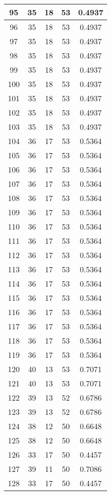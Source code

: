 \documentclass[letterpaper, 12pt]{article}
\begin{document}
\begin{longtable}{|c|c|c|c|c|}
\hline
95 & 35 & 18 & 53 & 0.4937 \\
\hline
96 & 35 & 18 & 53 & 0.4937 \\
\hline
97 & 35 & 18 & 53 & 0.4937 \\
\hline
98 & 35 & 18 & 53 & 0.4937 \\
\hline
99 & 35 & 18 & 53 & 0.4937 \\
\hline
100 & 35 & 18 & 53 & 0.4937 \\
\hline
101 & 35 & 18 & 53 & 0.4937 \\
\hline
102 & 35 & 18 & 53 & 0.4937 \\
\hline
103 & 35 & 18 & 53 & 0.4937 \\
\hline
104 & 36 & 17 & 53 & 0.5364 \\
\hline
105 & 36 & 17 & 53 & 0.5364 \\
\hline
106 & 36 & 17 & 53 & 0.5364 \\
\hline
107 & 36 & 17 & 53 & 0.5364 \\
\hline
108 & 36 & 17 & 53 & 0.5364 \\
\hline
109 & 36 & 17 & 53 & 0.5364 \\
\hline
110 & 36 & 17 & 53 & 0.5364 \\
\hline
111 & 36 & 17 & 53 & 0.5364 \\
\hline
112 & 36 & 17 & 53 & 0.5364 \\
\hline
113 & 36 & 17 & 53 & 0.5364 \\
\hline
114 & 36 & 17 & 53 & 0.5364 \\
\hline
115 & 36 & 17 & 53 & 0.5364 \\
\hline
116 & 36 & 17 & 53 & 0.5364 \\
\hline
117 & 36 & 17 & 53 & 0.5364 \\
\hline
118 & 36 & 17 & 53 & 0.5364 \\
\hline
119 & 36 & 17 & 53 & 0.5364 \\
\hline
120 & 40 & 13 & 53 & 0.7071 \\
\hline
121 & 40 & 13 & 53 & 0.7071 \\
\hline
122 & 39 & 13 & 52 & 0.6786 \\
\hline
123 & 39 & 13 & 52 & 0.6786 \\
\hline
124 & 38 & 12 & 50 & 0.6648 \\
\hline
125 & 38 & 12 & 50 & 0.6648 \\
\hline
126 & 33 & 17 & 50 & 0.4457 \\
\hline
127 & 39 & 11 & 50 & 0.7086 \\
\hline
128 & 33 & 17 & 50 & 0.4457 \\

\end{longtable}
\end{document}

